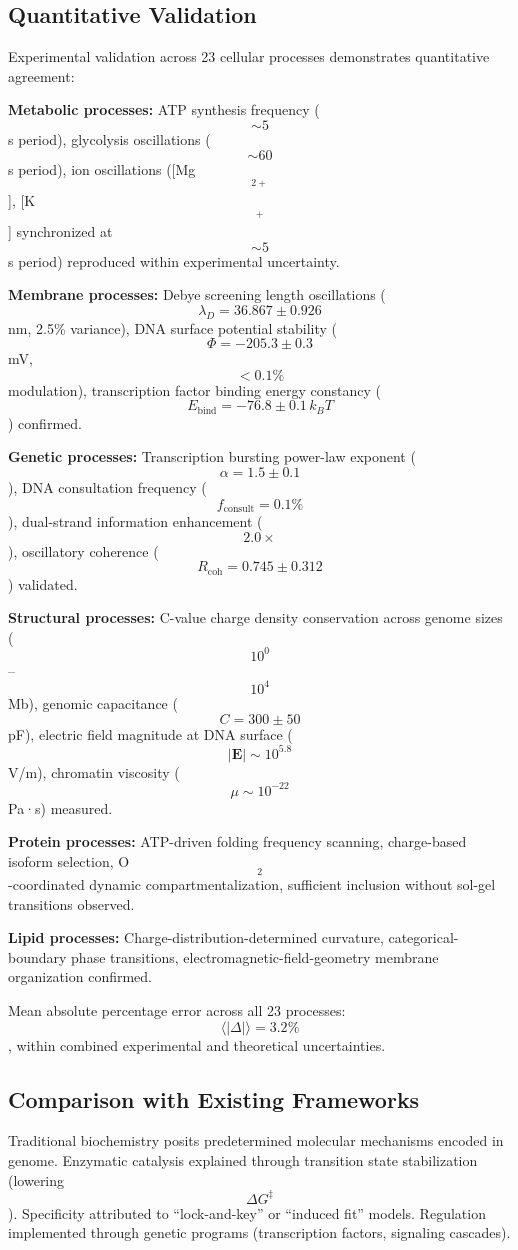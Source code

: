 \documentclass[11pt,twocolumn,a4paper]{article}
\theoremstyle{remark}
\begin{document}
\subsection{Quantitative Validation}

Experimental validation across 23 cellular processes demonstrates quantitative agreement:

\textbf{Metabolic processes:} ATP synthesis frequency ($$\sim 5$$ s period), glycolysis oscillations ($$\sim 60$$ s period), ion oscillations ([Mg$$^{2+}$$], [K$$^+$$] synchronized at $$\sim 5$$ s period) reproduced within experimental uncertainty.

\textbf{Membrane processes:} Debye screening length oscillations ($$\lambda_D = 36.867 \pm 0.926$$ nm, 2.5\% variance), DNA surface potential stability ($$\Phi = -205.3 \pm 0.3$$ mV, $$<0.1\%$$ modulation), transcription factor binding energy constancy ($$E_{\mathrm{bind}} = -76.8 \pm 0.1\, k_B T$$) confirmed.

\textbf{Genetic processes:} Transcription bursting power-law exponent ($$\alpha = 1.5 \pm 0.1$$), DNA consultation frequency ($$f_{\mathrm{consult}} = 0.1\%$$), dual-strand information enhancement ($$2.0\times$$), oscillatory coherence ($$R_{\mathrm{coh}} = 0.745 \pm 0.312$$) validated.

\textbf{Structural processes:} C-value charge density conservation across genome sizes ($$10^0$$--$$10^4$$ Mb), genomic capacitance ($$C = 300 \pm 50$$ pF), electric field magnitude at DNA surface ($$|\mathbf{E}| \sim 10^{5.8}$$ V/m), chromatin viscosity ($$\mu \sim 10^{-22}$$ Pa·s) measured.

\textbf{Protein processes:} ATP-driven folding frequency scanning, charge-based isoform selection, O$$_2$$-coordinated dynamic compartmentalization, sufficient inclusion without sol-gel transitions observed.

\textbf{Lipid processes:} Charge-distribution-determined curvature, categorical-boundary phase transitions, electromagnetic-field-geometry membrane organization confirmed.

Mean absolute percentage error across all 23 processes: $$\langle|\Delta|\rangle = 3.2\%$$, within combined experimental and theoretical uncertainties.

\subsection{Comparison with Existing Frameworks}

Traditional biochemistry posits predetermined molecular mechanisms encoded in genome. Enzymatic catalysis explained through transition state stabilization (lowering $$\Delta G^\ddagger$$). Specificity attributed to ``lock-and-key'' or ``induced fit'' models. Regulation implemented through genetic programs (transcription factors, signaling cascades).
\end{document}
